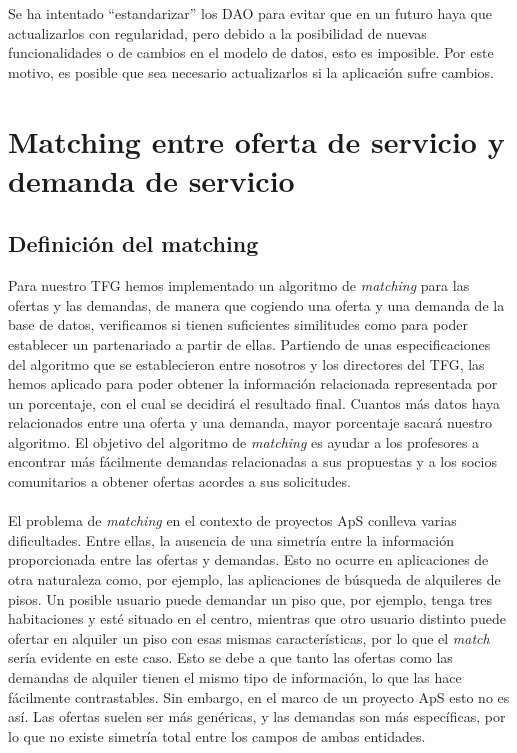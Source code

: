 \documentclass[11pt]{book}
\begin{document}
	Se ha intentado ``estandarizar'' los DAO para evitar que en un futuro haya que actualizarlos con regularidad, pero debido a la posibilidad de nuevas funcionalidades o de cambios en el modelo de datos, esto es imposible. Por este motivo, es posible que sea necesario actualizarlos si la aplicación sufre cambios.
	
	
	\chapter{Matching entre oferta de servicio y demanda de servicio}\label{cap:matching}
	\section{Definición del matching }
	Para nuestro TFG hemos implementado un algoritmo de \emph{matching} para las ofertas y las demandas, de manera que cogiendo una oferta y una demanda de la base de datos, verificamos si tienen suficientes similitudes como para poder establecer un partenariado a partir de ellas. Partiendo de unas especificaciones del algoritmo que se establecieron entre nosotros y los directores del TFG, las hemos aplicado para poder obtener la información relacionada representada por un porcentaje, con el cual se decidirá el resultado final.  Cuantos más datos haya relacionados entre una oferta y una demanda, mayor porcentaje sacará nuestro algoritmo. El objetivo del algoritmo de \emph{matching} es ayudar a los profesores a encontrar más fácilmente demandas relacionadas a sus propuestas y a los socios comunitarios a obtener ofertas acordes a sus solicitudes. \\\\
	El problema de \emph{matching} en el contexto de proyectos ApS conlleva varias dificultades. Entre ellas, la ausencia de una simetría entre la información proporcionada entre las ofertas y demandas. Esto no ocurre en aplicaciones de otra naturaleza como, por ejemplo, las aplicaciones de búsqueda de alquileres de pisos. Un posible usuario puede demandar un piso que, por ejemplo, tenga tres habitaciones y esté situado en el centro, mientras que otro usuario distinto puede ofertar en alquiler un piso con esas mismas características, por lo que el \emph{match} sería evidente en este caso. Esto se debe a que tanto las ofertas como las demandas de alquiler tienen el mismo tipo de información, lo que las hace fácilmente contrastables. Sin embargo, en el marco de un proyecto ApS esto no es así. Las ofertas suelen ser más genéricas, y las demandas son más específicas, por lo que no existe simetría total entre los campos de ambas entidades.\\\\
\end{document}
